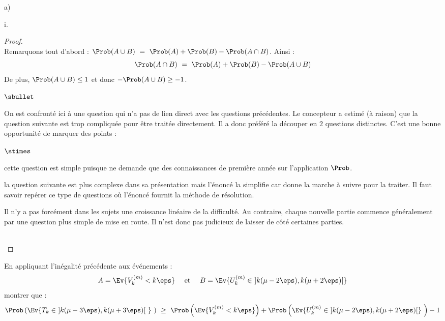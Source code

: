 \begin{liste}{a)}
\begin{nonoliste}{i.}
    \begin{proof}~\\%
      Remarquons tout d'abord : $\Prob(A \cup B) \ = \ \Prob(A) +
      \Prob(B) - \Prob(A \cap B)$. Ainsi :
      \[
      \Prob(A \cap B) \ = \ \Prob(A) + \Prob(B) - \Prob(A \cup B)
      \]
      De plus, $\Prob(A \cup B) \leq 1$ et donc $-\Prob(A \cup B) \geq
      -1$.%
      \begin{remarkL}{.97}%
        \begin{noliste}{$\sbullet$}
        \item On est confronté ici à une question qui n'a pas de lien
          direct avec les questions précédentes. Le concepteur a
          estimé (à raison) que la question suivante est trop
          compliquée pour être traitée directement. Il a donc préféré
          la découper en $2$ questions distinctes. C'est une bonne
          opportunité de marquer des points : 
          \begin{noliste}{$\stimes$}
          \item cette question  est simple puisque ne
            demande que des connaissances de première année sur
            l'application $\Prob$.
          \item la question suivante  est plus complexe
            dans sa présentation mais l'énoncé la simplifie car donne
            la marche à suivre pour la traiter. Il faut savoir repérer
            ce type de questions où l'énoncé fournit la méthode de
            résolution.
          \end{noliste}
        \item Il n'y a pas forcément dans les sujets une croissance
          linéaire de la difficulté. Au contraire, chaque nouvelle
          partie commence généralement par une question plus simple de
          mise en route. Il n'est donc pas judicieux de laisser de
          côté certaines parties.
        \end{noliste}
      \end{remarkL}~\\[-1.2cm]
    \end{proof}


    \newpage


  \item En appliquant l'inégalité précédente aux événements :
    \[
    A = \Ev{V_{k}^{(m)} < k \eps} \quad \text{ et } \quad B =
    \Ev{U_{k}^{(m)} \in \ ] k(\mu - 2 \eps), k(\mu + 2 \eps)[ }
    \]
    montrer que :
    \[
    \Prob\left(\Ev{T_{k} \in \ ]k(\mu - 3 \eps), k(\mu + 3 \eps)[ \ }
      \ \right) \ \geq \ \Prob\left(\Ev{ V_{k}^{(m)} < k \eps}\right)
    + \Prob\left(\Ev{U_{k}^{(m)} \in \ ]k(\mu - 2 \eps), k(\mu + 2
        \eps)[} \ \right) - 1
    \]


\end{nonoliste}
\end{liste}
